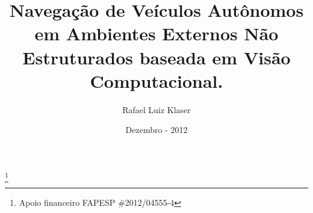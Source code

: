 
\title{Navegação de Veículos Autônomos em Ambientes Externos Não Estruturados baseada em Visão Computacional.}
\author{Rafael Luiz Klaser}
\date{Dezembro - 2012}
%
%


\address{
ICMC - Instituto de Ciências Matemáticas e de Computação\\
Universidade de São Paulo\\
}

\thanks{Apoio financeiro FAPESP \#2012/04555-4}